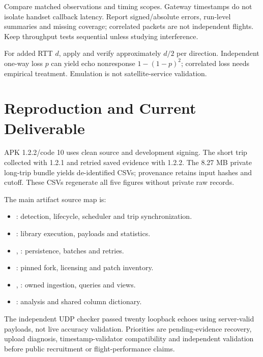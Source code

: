 Compare matched observations and timing scopes. Gateway timestamps do not
isolate handset callback latency. Report signed/absolute errors, run-level
summaries and missing coverage; correlated packets are not independent flights.
Keep throughput tests sequential unless studying interference.

For added RTT $d$, apply and verify approximately $d/2$ per direction. Independent
one-way loss $p$ can yield echo nonresponse $1-(1-p)^2$; correlated loss needs
empirical treatment. Emulation is not satellite-service validation.

\section{Reproduction and Current Deliverable}
\label{app:reproduction}
APK 1.2.2/code 10 uses clean source  and development signing.
The short trip collected with 1.2.1 and retried saved evidence with 1.2.2.
The 8.27 MB private long-trip bundle yields de-identified CSVs; provenance retains
input hashes and cutoff. These CSVs regenerate all five figures without private
raw records.

The main artifact source map is:
\begin{itemize}
\item {}: detection, lifecycle, scheduler and trip synchronization.
\item {}: library execution, payloads and statistics.
\item {}, : persistence, batches and retries.
\item {}: pinned fork, licensing and patch inventory.
\item {}, : owned ingestion, queries and views.
\item {}: analysis and shared column dictionary.
\end{itemize}

The independent UDP checker passed twenty loopback echoes using server-valid
payloads, not live accuracy validation. Priorities are pending-evidence recovery,
upload diagnosis, timestamp-validator compatibility and independent validation
before public recruitment or flight-performance claims.
